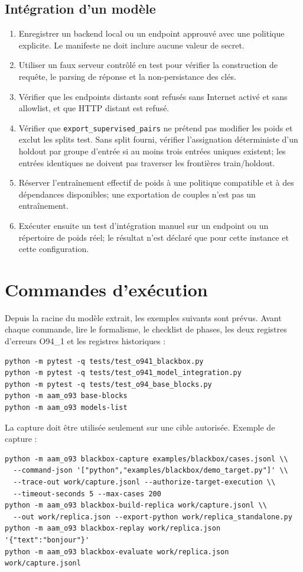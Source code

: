 \documentclass[11pt,a4paper]{article}
\begin{document}
\subsection{Intégration d'un modèle}
\begin{enumerate}[nosep]
\item Enregistrer un backend local ou un endpoint approuvé avec une politique explicite. Le manifeste ne doit inclure aucune valeur de secret.
\item Utiliser un faux serveur contrôlé en test pour vérifier la construction de requête, le parsing de réponse et la non-persistance des clés.
\item Vérifier que les endpoints distants sont refusés sans Internet activé et sans allowlist, et que HTTP distant est refusé.
\item Vérifier que \texttt{export\_supervised\_pairs} ne prétend pas modifier les poids et exclut les splits test. Sans split fourni, vérifier l'assignation déterministe d'un holdout par groupe d'entrée si au moins trois entrées uniques existent; les entrées identiques ne doivent pas traverser les frontières train/holdout.
\item Réserver l'entraînement effectif de poids à une politique compatible et à des dépendances disponibles; une exportation de couples n'est pas un entraînement.
\item Exécuter ensuite un test d'intégration manuel sur un endpoint ou un répertoire de poids réel; le résultat n'est déclaré que pour cette instance et cette configuration.
\end{enumerate}

\section{Commandes d'exécution}
Depuis la racine du modèle extrait, les exemples suivants sont prévus. Avant chaque commande, lire le formalisme, le checklist de phases, les deux registres d'erreurs O94\_1 et les registres historiques :
\begin{verbatim}
python -m pytest -q tests/test_o941_blackbox.py
python -m pytest -q tests/test_o941_model_integration.py
python -m pytest -q tests/test_o94_base_blocks.py
python -m aam_o93 base-blocks
python -m aam_o93 models-list
\end{verbatim}

La capture doit être utilisée seulement sur une cible autorisée. Exemple de capture :
\begin{verbatim}
python -m aam_o93 blackbox-capture examples/blackbox/cases.jsonl \\
  --command-json '["python","examples/blackbox/demo_target.py"]' \\
  --trace-out work/capture.jsonl --authorize-target-execution \\
  --timeout-seconds 5 --max-cases 200
python -m aam_o93 blackbox-build-replica work/capture.jsonl \\
  --out work/replica.json --export-python work/replica_standalone.py
python -m aam_o93 blackbox-replay work/replica.json '{"text":"bonjour"}'
python -m aam_o93 blackbox-evaluate work/replica.json work/capture.jsonl
\end{verbatim}
\end{document}
